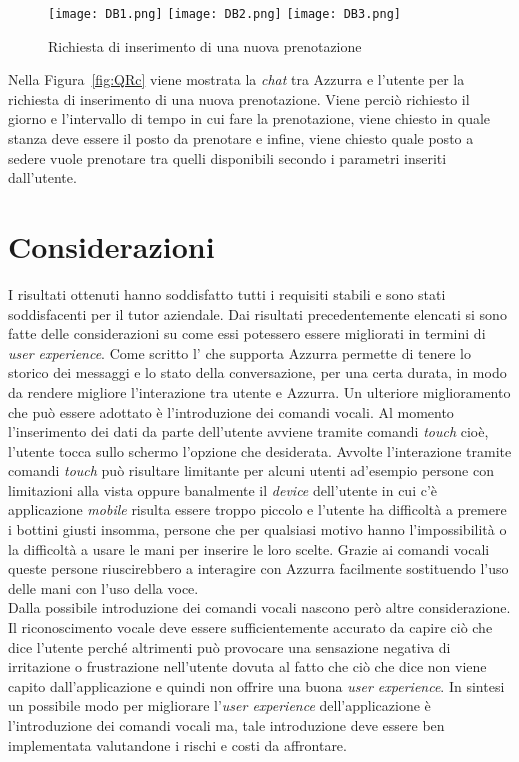 \begin{figure}[h]
	\begin{center}
		\texttt{[image: DB1.png]}\hfill
		\texttt{[image: DB2.png]}\hfill
		\texttt{[image: DB3.png]}
		\caption{Richiesta di inserimento di una nuova prenotazione}\label{fig:DB}
	\end{center}
\end{figure}
\clearpage
Nella Figura~\ref{fig:QRc} viene mostrata la \emph{chat} tra Azzurra e l'utente per la richiesta di inserimento di una nuova prenotazione. Viene perciò richiesto il giorno e l'intervallo di tempo in cui fare la prenotazione, viene chiesto in quale stanza deve essere il posto da prenotare e infine, viene chiesto quale posto a sedere vuole prenotare tra quelli disponibili secondo i parametri inseriti dall'utente.

\section{Considerazioni}
I risultati ottenuti hanno soddisfatto tutti i requisiti stabili e sono stati soddisfacenti per il tutor aziendale. Dai risultati precedentemente elencati si sono fatte delle considerazioni su come essi potessero essere migliorati in termini di \emph{user experience}. Come scritto l' che supporta Azzurra permette di tenere lo storico dei messaggi e lo stato della conversazione, per una certa durata, in modo da rendere migliore l'interazione tra utente e Azzurra. Un ulteriore miglioramento che può essere adottato è l'introduzione dei comandi vocali. Al momento l'inserimento dei dati da parte dell'utente avviene tramite comandi \emph{touch} cioè, l'utente tocca sullo schermo l'opzione che desiderata. Avvolte l'interazione tramite comandi \emph{touch} può risultare limitante per alcuni utenti ad'esempio persone con limitazioni alla vista oppure banalmente il \emph{device} dell'utente in cui c'è applicazione \emph{mobile} risulta essere troppo piccolo e l'utente ha difficoltà a premere i bottini giusti insomma, persone che per qualsiasi motivo hanno l'impossibilità o la difficoltà a usare le mani per inserire le loro scelte. Grazie ai comandi vocali queste persone riuscirebbero a interagire con Azzurra facilmente sostituendo l'uso delle mani con l'uso della voce. \\

Dalla possibile introduzione dei comandi vocali nascono però altre considerazione. Il riconoscimento vocale deve essere sufficientemente accurato da capire ciò che dice l'utente perché altrimenti può provocare una sensazione negativa di irritazione o frustrazione nell'utente dovuta al fatto che ciò che dice non viene capito dall'applicazione e quindi non offrire una buona \emph{user experience}. In sintesi un possibile modo per migliorare l'\emph{user experience} dell'applicazione è l'introduzione dei comandi vocali ma, tale introduzione deve essere ben implementata valutandone i rischi e costi da affrontare.

